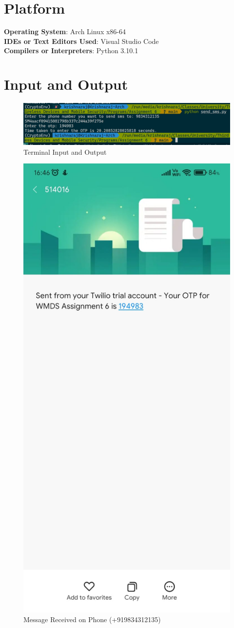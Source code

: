 \documentclass[11pt]{article}
\begin{document}
\section{Platform}
\textbf{Operating System}: Arch Linux x86-64 \\
\textbf{IDEs or Text Editors Used}: Visual Studio Code\\
\textbf{Compilers or Interpreters}: Python 3.10.1\\

\section{Input and Output}

\begin{figure}[H]
    \centering
    \includegraphics[width=.95\textwidth]{./output.jpeg}
    \caption{Terminal Input and Output}
\end{figure}

\begin{figure}[H]
    \centering
    \includegraphics[width=.45\textwidth]{./message.jpeg}
    \caption{Message Received on Phone (+919834312135)}
\end{figure}
\end{document}
